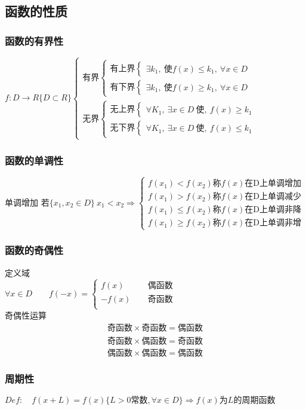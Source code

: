  \subsection{函数的性质}
 \subsubsection{函数的有界性}
 $f:D\rightarrow R\{D\subset R\}$$\begin{cases}
    \mbox{有界}\begin{cases}
        \mbox{有上界}\begin{cases}
            \exists k_1,\ \mbox{使}f(x)\leqslant k_1,\ \forall x\in D  
        \end{cases}\\
        \mbox{有下界}\begin{cases}
            \exists k_1,\ \mbox{使}f(x)\geqslant  k_1,\ \forall x\in D  
        \end{cases}
    \end{cases}\\
    \mbox{无界}\begin{cases}
        \mbox{无上界}\begin{cases}
            \forall K_1,\ \exists x\in D\ \mbox{使},\ f(x)\geqslant  k_1
        \end{cases}\\
        \mbox{无下界}\begin{cases}
            \forall K_1,\ \exists x\in D\ \mbox{使},\ f(x)\leqslant  k_1
        \end{cases}
    \end{cases}
 \end{cases}$
 \subsubsection{函数的单调性}
 单调增加
 $\mbox{若}\{x_1,x_2\in D\}\ x_1<x_2\Rightarrow \begin{cases}
    f(x_1)<f(x_2)  \mbox{称}f(x)\mbox{在D上单调增加}\\
    f(x_1)>f(x_2)  \mbox{称}f(x)\mbox{在D上单调减少}\\
    f(x_1)\leqslant f(x_2)  \mbox{称}f(x)\mbox{在D上单调非降}\\
    f(x_1)\geqslant f(x_2)  \mbox{称}f(x)\mbox{在D上单调非增}
 \end{cases}$
 \subsubsection{函数的奇偶性}
 定义域\\ 
 \bigskip
 $\forall x\in D\qquad f(-x)=\begin{cases}
    f(x)\qquad &\mbox{偶函数}\\
    -f(x) &\mbox{奇函数}\\
 \end{cases}$\\
 \bigskip
 奇偶性运算
\begin{align}
    \mbox{奇函数}\times \mbox{奇函数}=\mbox{偶函数}\\
    \mbox{奇函数}\times \mbox{偶函数}=\mbox{奇函数}\\
    \mbox{偶函数}\times \mbox{偶函数}=\mbox{偶函数}
 \end{align}
 \subsubsection{周期性}
 $Def:\quad f(x+L)=f(x) \{L>0\mbox{常数},\forall x\in D\}\Rightarrow \mbox{$f(x)$为$L$的周期函数}$